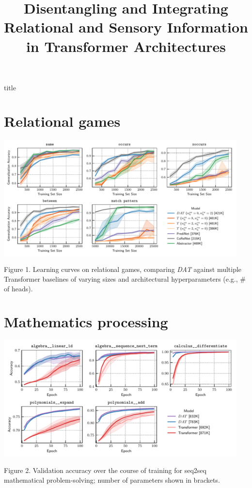 \documentclass[a0,landscape,pdftex]{a0poster}
\title{Disentangling and Integrating Relational and Sensory Information in Transformer Architectures}
\date{}
\begin{document}
\begin{staticcontents*}{title}
\maketitle
\end{staticcontents*}
\thispagestyle{empty}

\Large

\section*{Relational games}

\begin{minipage}{55cm}




\begin{center}
\includegraphics[width=0.95\textwidth]{../figs/experiments/relgames/relgames_learning_curves_baseline_comparisons.pdf}
\end{center}
{\rm Figure 1. Learning curves on relational games, comparing \textit{DAT} against multiple Transformer baselines of varying sizes and architectural hyperparameters (e.g., \# of heads).}
\vskip2cm


\section*{Mathematics processing}




\includegraphics[width=0.95\textwidth]{../figs/experiments/math/math_training_curves_interpolation.pdf}

{\rm Figure 2. Validation accuracy over the course of training for seq2seq mathematical problem-solving;
number of parameters shown in brackets.}
\end{minipage}
\end{document}
